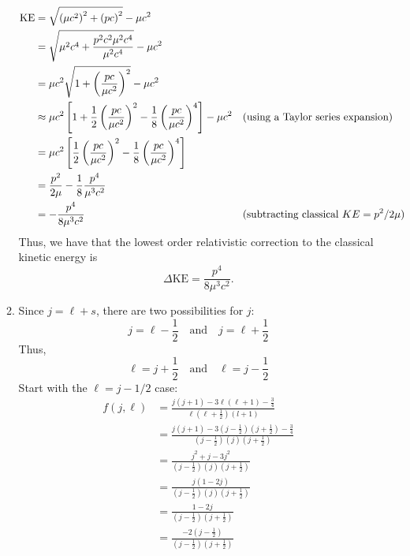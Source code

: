 \documentclass[10pt]{article}
\begin{document}
\begin{enumerate}
\begin{enumerate}
\begin{align*}
     \text{KE} &= \sqrt{\left( \mu c ^2 \right)^2 + \left( pc \right)^2} - \mu c ^2 \\
        &= \sqrt{ \mu^2 c ^4  +  \frac{p^2c ^2 \mu^2 c^4}{\mu^2 c^4}} - \mu c ^2 \\
        &= \mu c ^2\sqrt{ 1  +  \left(\frac{pc}{\mu c^2}\right)^2} - \mu c ^2 \\
        &\approx \mu c ^2\left[ 1  +  \frac{1}{2}\left(\frac{pc}{\mu c^2} \right) ^2 - \frac{1}{8}\left(\frac{pc}{\mu c^2} \right)^4\right] - \mu c ^2 && \text{(using a Taylor series expansion)} \\
        &= \mu c ^2\left[ \frac{1}{2}\left(\frac{pc}{\mu c^2} \right) ^2 - \frac{1}{8}\left(\frac{pc}{\mu c^2} \right)^4\right] \\
        &= \frac{p^2}{2 \mu} - \frac{1}{8} \frac{p ^4}{\mu^3c^2} \\
        &= - \frac{p ^4}{8 \mu ^3 c ^2} && \text{(subtracting classical $ KE = p^2 / 2\mu $)}
   \end{align*}
   Thus, we have that the lowest order relativistic correction to the classical kinetic energy is 
   \[
     \Delta \text{KE} = \frac{p ^4}{8 \mu ^3 c ^2}.
   \]
  \item 
    Since $ j = \ell + s $, there are two possibilities for $ j $:
    \[
      j=\ell - \frac{1}{2} \quad \text{and} \quad j = \ell + \frac{1}{2}
    \]
    Thus,
    \[
      \ell=j + \frac{1}{2} \quad \text{and} \quad \ell = j - \frac{1}{2}
    \]
    Start with the $ \ell = j - 1/2 $ case:
    \begin{align*}
      f (j, \ell) &= \frac{j \left( j+1 \right) - 3 \ell \left( \ell + 1 \right) - \frac{3}{4}}{\ell \left(  \ell + \frac{1}{2} \right)\left( l+1 \right)} \\
      &= \frac{j \left( j+1 \right) - 3 \left( j - \frac{1}{2} \right) \left( j + \frac{1}{2} \right) - \frac{3}{4}}{\left( j - \frac{1}{2} \right) \left(  j \right)\left( j+\frac{1}{2} \right)} \\
      &= \frac{j^2 + j - 3 j^2 }{\left( j - \frac{1}{2} \right) \left(  j \right)\left( j+\frac{1}{2} \right)} \\
      &= \frac{j \left( 1-2j \right)}{\left( j - \frac{1}{2} \right) \left(  j \right)\left( j+\frac{1}{2} \right)} \\
      &= \frac{ 1-2j }{\left( j - \frac{1}{2} \right) \left( j+\frac{1}{2} \right)} \\
      &= \frac{ -2 \left( j - \frac{1}{2} \right) }{\left( j - \frac{1}{2} \right) \left( j+\frac{1}{2} \right)} \\

\end{align*}
\end{enumerate}
\end{enumerate}
\end{document}
